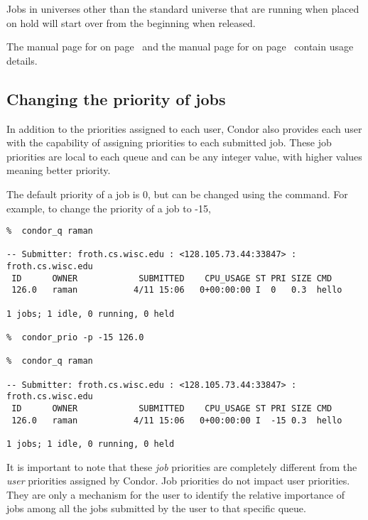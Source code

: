 Jobs in universes other than the standard universe that are running
when placed on hold will start over from the beginning when 
released.

The manual page for 
on page~\pageref{man-condor-hold}
and the manual page for 
on page~\pageref{man-condor-release}
contain usage details.

\subsection{\label{sec:job-prio}Changing the priority of jobs}

In addition to the priorities assigned to each user, Condor also provides
each user with the capability of assigning priorities to each submitted job.
These job priorities are local to each queue and can be any integer value, with
higher values meaning better priority.

The default priority of a job is 0, but can be changed using the 
command.
For example, to change the priority of a job to -15,
\footnotesize
\begin{verbatim}
%  condor_q raman

-- Submitter: froth.cs.wisc.edu : <128.105.73.44:33847> : froth.cs.wisc.edu
 ID      OWNER            SUBMITTED    CPU_USAGE ST PRI SIZE CMD               
 126.0   raman           4/11 15:06   0+00:00:00 I  0   0.3  hello             

1 jobs; 1 idle, 0 running, 0 held

%  condor_prio -p -15 126.0

%  condor_q raman

-- Submitter: froth.cs.wisc.edu : <128.105.73.44:33847> : froth.cs.wisc.edu
 ID      OWNER            SUBMITTED    CPU_USAGE ST PRI SIZE CMD               
 126.0   raman           4/11 15:06   0+00:00:00 I  -15 0.3  hello             

1 jobs; 1 idle, 0 running, 0 held
\end{verbatim}
\normalsize

It is important to note that these \emph{job} priorities are completely 
different from the \emph{user} priorities assigned by Condor.  Job priorities
do not impact user priorities.  They are only a mechanism for the user to
identify the relative importance of jobs among all the jobs submitted by the
user to that specific queue.

